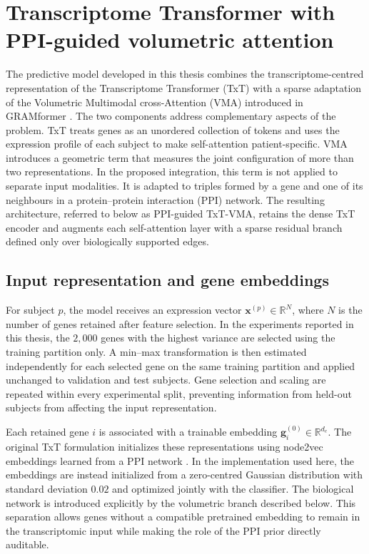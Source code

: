\section{Transcriptome Transformer with PPI-guided volumetric attention}
\label{sec:method_txt_vma}

The predictive model developed in this thesis combines the transcriptome-centred representation of the Transcriptome Transformer (TxT) with a sparse adaptation of the Volumetric Multimodal cross-Attention (VMA) introduced in GRAMformer \cite{koo2025transcriptome_transformer,cicchetti2026gramformer}. The two components address complementary aspects of the problem. TxT treats genes as an unordered collection of tokens and uses the expression profile of each subject to make self-attention patient-specific. VMA introduces a geometric term that measures the joint configuration of more than two representations. In the proposed integration, this term is not applied to separate input modalities. It is adapted to triples formed by a gene and one of its neighbours in a protein--protein interaction (PPI) network. The resulting architecture, referred to below as PPI-guided TxT-VMA, retains the dense TxT encoder and augments each self-attention layer with a sparse residual branch defined only over biologically supported edges.

\subsection{Input representation and gene embeddings}

For subject \(p\), the model receives an expression vector \(\mathbf{x}^{(p)}\in\mathbb{R}^{N}\), where \(N\) is the number of genes retained after feature selection. In the experiments reported in this thesis, the \(2{,}000\) genes with the highest variance are selected using the training partition only. A min--max transformation is then estimated independently for each selected gene on the same training partition and applied unchanged to validation and test subjects. Gene selection and scaling are repeated within every experimental split, preventing information from held-out subjects from affecting the input representation.

Each retained gene \(i\) is associated with a trainable embedding \(\mathbf{g}^{(0)}_i\in\mathbb{R}^{d_e}\). The original TxT formulation initializes these representations using node2vec embeddings learned from a PPI network \cite{koo2025transcriptome_transformer}. In the implementation used here, the embeddings are instead initialized from a zero-centred Gaussian distribution with standard deviation \(0.02\) and optimized jointly with the classifier. The biological network is introduced explicitly by the volumetric branch described below. This separation allows genes without a compatible pretrained embedding to remain in the transcriptomic input while making the role of the PPI prior directly auditable.

